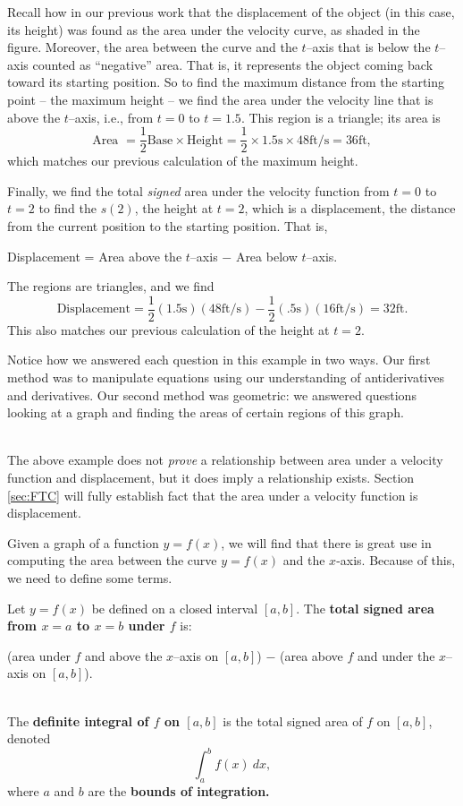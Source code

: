 {Recall how in our previous work that the displacement of the object (in this case, its height) was found as the area under the velocity curve, as shaded in the figure. Moreover, the area between the curve and the $t$--axis that is below the $t$--axis counted as ``negative'' area. That is, it represents the object coming back toward its starting position. So to find the maximum distance from the starting point -- the maximum height -- we find the area under the velocity line that is above the $t$--axis, i.e., from $t=0$ to $t=1.5$. This region is a triangle; its area is 
\[
\text{Area } = \frac12\text{Base} \times \text{Height} =\frac12\times 1.5\text{s}\times 48\text{ft/s} = 36\text{ft},
\]
which matches our previous calculation of the maximum height.

\drawexampleline
Finally, we find the total \textit{signed} area under the velocity function from $t=0$ to $t=2$ to find the $s(2)$, the height at $t=2$, which is a displacement, the distance from the current position to the starting position. That is,
	\begin{center}
	Displacement = Area above the $t$--axis $-$ Area below $t$--axis.
	\end{center}
	The regions are triangles, and we find 
	\[
	\text{Displacement} = \frac12(1.5\text{s})(48\text{ft/s}) - \frac12(.5\text{s})(16\text{ft/s}) = 32\text{ft}.
	\]
This also matches our previous calculation of the height at $t=2$.

Notice how we answered each question in this example in two ways. Our first method was to manipulate equations using our understanding of antiderivatives and derivatives. Our second method was geometric: we answered questions looking at a graph and finding the areas of certain regions of this graph.
}\\

The above example does not \textit{prove} a relationship between area under a velocity function and displacement, but it does imply a relationship exists. Section \ref{sec:FTC} will fully establish fact that the area under a velocity function is displacement.

Given a graph of a function $y=f(x)$, we will find that there is great use in computing the area between the curve $y=f(x)$ and the $x$-axis. Because of this, we need to define some terms.

{Let $y=f(x)$ be defined on a closed interval $[a,b]$. The \textbf{total signed area from $x=a$ to $x=b$ under $f$} is:

\noindent\parbox{\specialboxlength}{\centering (area  under $f$ and above the $x$--axis on $[a,b]$) $-$ (area above $f$ and under the $x$--axis on $[a,b]$).}\\

The \textbf{definite integral of $f$ on $[a,b]$} is the total signed area of $f$ on $[a,b]$, denoted 
\[
\int_a^b f(x)\ dx,
\]
where $a$ and $b$ are the \textbf{bounds of integration.}
}


